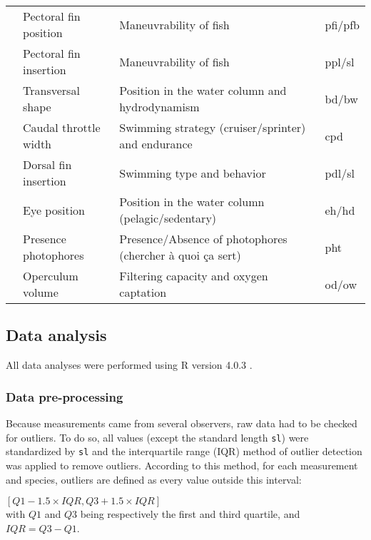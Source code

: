 \begin{sidewaystable}
\begin{tabular}{>{\bfseries}lll>{\ttfamily}l}
  &Pectoral fin position & Maneuvrability of fish & pfi/pfb \\ 
  &Pectoral fin insertion & Maneuvrability of fish & ppl/sl \\ 
  &Transversal shape & Position in the water column and hydrodynamism & bd/bw \\ 
  &Caudal throttle width & Swimming strategy (cruiser/sprinter) and endurance & cpd \\ 
  &Dorsal fin insertion & Swimming type and behavior & pdl/sl \\ 
\midrule
  \multirow{2}{*}{Habitat} &Eye position & Position in the water column (pelagic/sedentary) & eh/hd \\ 
  &Presence photophores & Presence/Absence of photophores (chercher à quoi ça sert) & pht \\ 
  &Operculum volume & Filtering capacity and oxygen captation & od/ow \\ 
\bottomrule
\end{tabular}
\end{sidewaystable}

\subsection{Data analysis}
All data analyses were performed using \textsf{R} version 4.0.3 \citep{rcoreteam2021}.


\subsubsection{Data pre-processing}
Because measurements came from several observers, raw data had to be checked for outliers. To do so, all values (except the standard length \texttt{sl}) were standardized by \texttt{sl} and the interquartile range (IQR) method of outlier detection was applied to remove outliers. According to this method, for each measurement and species, outliers are defined as every value outside this interval: 
\begin{center}
$ [Q1 - 1.5 \times IQR, Q3 + 1.5 \times IQR]$ \\
with $Q1$ and $Q3$ being respectively the first and third quartile, and $IQR = Q3 - Q1$. 
\end{center}{}

